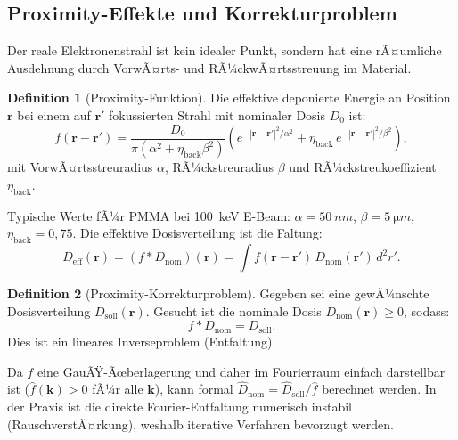 ﻿\documentclass[a4paper,12pt]{article}
\theoremstyle{definition}
\newtheorem{definition}{Definition}[section]
\newcommand{\vect}[1]{\bm{#1}}
\begin{document}
	\subsection{Proximity-Effekte und Korrekturproblem}
	
	Der reale Elektronenstrahl ist kein idealer Punkt, sondern hat eine
	rÃ¤umliche Ausdehnung durch VorwÃ¤rts- und RÃ¼ckwÃ¤rtsstreuung im Material.
	
	\begin{definition}[Proximity-Funktion]
		\label{def:proximity}
		Die effektive deponierte Energie an Position $\vect{r}$ bei einem auf
		$\vect{r}'$ fokussierten Strahl mit nominaler Dosis $D_0$ ist:
		\begin{equation}
			f(\vect{r} - \vect{r}') = \frac{D_0}{\pi(\alpha^2 + \eta_\mathrm{back}\beta^2)}
			\left(
			e^{-|\vect{r}-\vect{r}'|^2/\alpha^2}
			+ \eta_\mathrm{back}\, e^{-|\vect{r}-\vect{r}'|^2/\beta^2}
			\right),
			\label{eq:proximity}
		\end{equation}
		mit VorwÃ¤rtsstreuradius $\alpha$, RÃ¼ckstreuradius $\beta$ und
		RÃ¼ckstreukoeffizient $\eta_\mathrm{back}$.
	\end{definition}
	
	Typische Werte fÃ¼r PMMA bei \SI{100}{keV} E-Beam:
	$\alpha = \SI{50}{nm}$, $\beta = \SI{5}{\micro m}$, $\eta_\mathrm{back} = 0{,}75$.
	Die effektive Dosisverteilung ist die Faltung:
	\begin{equation}
		D_\mathrm{eff}(\vect{r}) = (f * D_\mathrm{nom})(\vect{r})
		= \int f(\vect{r} - \vect{r}')\, D_\mathrm{nom}(\vect{r}')\, d^2r'.
		\label{eq:faltung}
	\end{equation}
	
	\begin{definition}[Proximity-Korrekturproblem]
		\label{def:proximity-korrektur}
		Gegeben sei eine gewÃ¼nschte Dosisverteilung $D_\mathrm{soll}(\vect{r})$.
		Gesucht ist die nominale Dosis $D_\mathrm{nom}(\vect{r}) \geq 0$, sodass:
		\begin{equation}
			f * D_\mathrm{nom} = D_\mathrm{soll}.
			\label{eq:proximity-korrekturproblem}
		\end{equation}
		Dies ist ein lineares Inverseproblem (Entfaltung).
	\end{definition}
	
	Da $f$ eine GauÃŸ-Ãœberlagerung und daher im Fourierraum einfach darstellbar
	ist ($\hat{f}(\vect{k}) > 0$ fÃ¼r alle $\vect{k}$), kann formal
	$\hat{D}_\mathrm{nom} = \hat{D}_\mathrm{soll}/\hat{f}$ berechnet werden.
	In der Praxis ist die direkte Fourier-Entfaltung numerisch instabil
	(RauschverstÃ¤rkung), weshalb iterative Verfahren bevorzugt werden.
	
\end{document}
